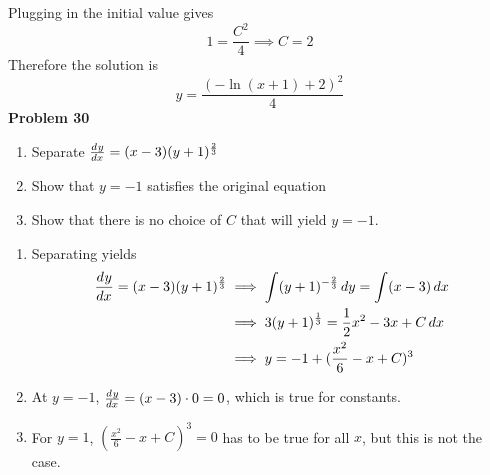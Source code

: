 Plugging in the initial value gives 
\[
    1 = \frac{C^2}{4} \implies C = 2
\]
Therefore the solution is 
\[
    y  = \frac{(-\ln(x+1) + 2)^2}{4}
\]
\textbf{Problem 30}
\begin{enumerate}
    \item Separate $\frac{d^{} y}{d x^{}} = (x-3)(y+1)^{\frac{2}{3}}$
    \item Show that $y=-1$ satisfies the original equation 
    \item Show that there is no choice of $C$ that will yield $y=-1$.
\end{enumerate}
\solution 
\begin{enumerate}
    \item Separating yields 
        \begin{align*}
            \frac{d^{} y}{d x^{}} = (x-3)(y+1)^{\frac{2}{3}}
            &\implies \int (y+1)^{-\frac{2}{3}} \,dy = \int (x-3) \,dx \\
            &\implies 3(y+1)^\frac{1}{3} = \frac{1}{2}x^2-3x + C \,dx \\ 
            &\implies y = -1 + (\frac{x^2}{6}-x+C)^3
        \end{align*}
    \item At $y=-1$, $\frac{d^{} y}{d x^{}} = (x-3)\cdot 0 = 0$, 
        which is true for constants.
    \item For $y=1$, $(\frac{x^2}{6}-x+C)^3 = 0$ has to be true for all $x$,
        but this is not the case.
\end{enumerate}

